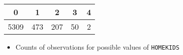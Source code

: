 \documentclass[]{article}
\providecommand{\tightlist}{%
  \setlength{\itemsep}{0pt}\setlength{\parskip}{0pt}}
\begin{document}
\begin{longtable}[]{@{}ccccc@{}}
\toprule
\begin{minipage}[b]{0.08\columnwidth}\centering\strut
0\strut
\end{minipage} & \begin{minipage}[b]{0.07\columnwidth}\centering\strut
1\strut
\end{minipage} & \begin{minipage}[b]{0.07\columnwidth}\centering\strut
2\strut
\end{minipage} & \begin{minipage}[b]{0.06\columnwidth}\centering\strut
3\strut
\end{minipage} & \begin{minipage}[b]{0.06\columnwidth}\centering\strut
4\strut
\end{minipage}\tabularnewline
\midrule
\endhead
\begin{minipage}[t]{0.08\columnwidth}\centering\strut
5309\strut
\end{minipage} & \begin{minipage}[t]{0.07\columnwidth}\centering\strut
473\strut
\end{minipage} & \begin{minipage}[t]{0.07\columnwidth}\centering\strut
207\strut
\end{minipage} & \begin{minipage}[t]{0.06\columnwidth}\centering\strut
50\strut
\end{minipage} & \begin{minipage}[t]{0.06\columnwidth}\centering\strut
2\strut
\end{minipage}\tabularnewline
\bottomrule
\end{longtable}

\begin{itemize}
\tightlist
\item
  Counts of observations for possible values of \texttt{HOMEKIDS}
\end{itemize}
\end{document}

